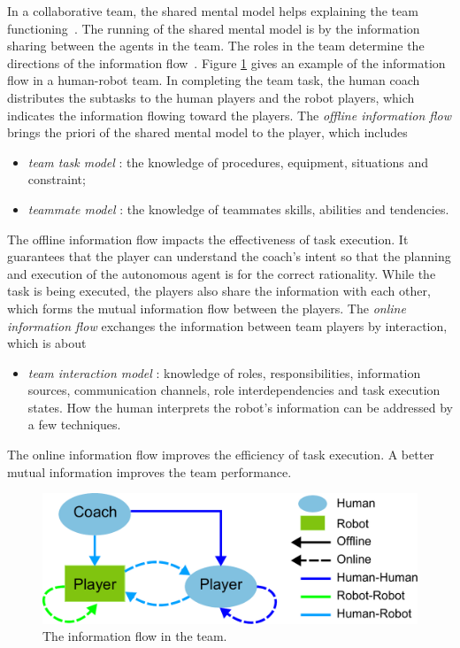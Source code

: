 \documentclass[phd]{byuprop}
\begin{document}
In a collaborative team, the shared mental model helps explaining the team functioning~\cite{Jonker:2010:SMM:2018118.2018128}.
The running of the shared mental model is by the information sharing between the agents in the team.
The roles in the team determine the directions of the information flow~\cite{Yen_implementingshared}.
Figure \ref{fig:team_info_flow} gives an example of the information flow in a human-robot team.
In completing the team task, the human coach distributes the subtasks to the human players and the robot players, which indicates the information flowing toward the players.
The {\em offline information flow} brings the priori of the shared mental model to the player, which includes~\cite{Goodrich2013}
\begin{itemize}
\item {\em team task model} : the knowledge of procedures, equipment, situations and constraint; 
\item {\em teammate model} : the knowledge of teammates skills, abilities and tendencies.
\end{itemize}
The offline information flow impacts the effectiveness of task execution.
It guarantees that the player can understand the coach's intent so that the planning and execution of the autonomous agent is for the correct rationality.
While the task is being executed, the players also share the information with each other, which forms the mutual information flow between the players.
The {\em online information flow} exchanges the information between team players by interaction, which is about
\begin{itemize} 
\item {\em team interaction model} : knowledge of roles, responsibilities, information sources, communication channels, role interdependencies and task execution states.
How the human interprets the robot's information can be addressed by a few techniques. 
\end{itemize}
The online information flow improves the efficiency of task execution.
A better mutual information improves the team performance.

\begin{figure}[hbtp]
\centering
\includegraphics[width=0.8\linewidth]{./fig/team_info_flow.pdf}
\caption{The information flow in the team.}
\label{fig:team_info_flow}
\end{figure}
\end{document}
